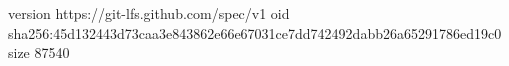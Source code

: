 version https://git-lfs.github.com/spec/v1
oid sha256:45d132443d73caa3e843862e66e67031ce7dd742492dabb26a65291786ed19c0
size 87540
